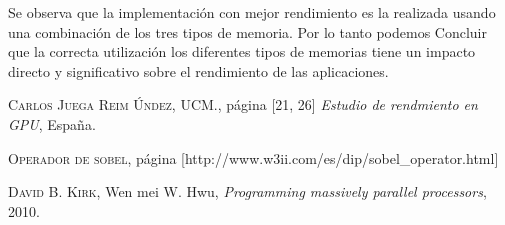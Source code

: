 \documentclass[journal]{IEEEtran}
\begin{document}
Se observa que la implementaci\'on con mejor rendimiento es la realizada usando una combinaci\'on de los tres tipos de memoria. Por lo tanto podemos Concluir que la correcta utilizaci\'on los diferentes tipos de memorias tiene un impacto directo y significativo sobre el rendimiento de las aplicaciones.







%
%
%
\begin{thebibliography}{1}

 \textsc{Carlos Juega Reim \'Undez, UCM.}, p\'agina [21, 26]
 \textit{Estudio de rendmiento en GPU}, Espa\~na.

 \textsc{Operador de sobel}, p\'agina [http://www.w3ii.com/es/dip/sobel\_operator.html]

 \textsc{David B. Kirk}, {Wen mei W. Hwu},
 \textit{Programming massively parallel processors}, 2010.

\end{thebibliography}

% 







\end{document}
